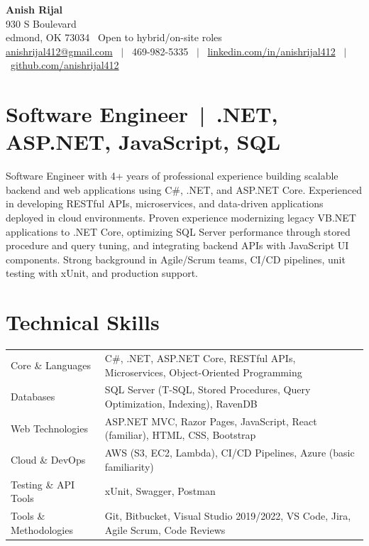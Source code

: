 \documentclass[a4paper,10pt]{article}
\begin{document}
\pagestyle{empty}

\begin{center}
{\Huge \textbf{Anish Rijal}} \\[4pt]

930 S Boulevard \\
edmond, OK 73034 \textbullet\ Open to hybrid/on-site roles \\[4pt]

\href{mailto:anishrijal412@gmail.com}{anishrijal412@gmail.com} \ $|$ \
469-982-5335 \ $|$ \
\href{https://www.linkedin.com/in/anishrijal412}{linkedin.com/in/anishrijal412} \ $|$ \
\href{https://github.com/anishrijal412}{github.com/anishrijal412}
\end{center}

\section*{Software Engineer \,|\, .NET, ASP.NET, JavaScript, SQL}

Software Engineer with 4+ years of professional experience building scalable backend and web applications using C\#, .NET, and ASP.NET Core. Experienced in developing RESTful APIs, microservices, and data-driven applications deployed in cloud environments. Proven experience modernizing legacy VB.NET applications to .NET Core, optimizing SQL Server performance through stored procedure and query tuning, and integrating backend APIs with JavaScript UI components. Strong background in Agile/Scrum teams, CI/CD pipelines, unit testing with xUnit, and production support.

\section{Technical Skills}
\begin{tabularx}{\linewidth}{@{}l X@{}}
Core \& Languages & C\#, .NET, ASP.NET Core, RESTful APIs, Microservices, Object-Oriented Programming \\
Databases & SQL Server (T-SQL, Stored Procedures, Query Optimization, Indexing), RavenDB \\
Web Technologies & ASP.NET MVC, Razor Pages, JavaScript, React (familiar), HTML, CSS, Bootstrap \\
Cloud \& DevOps & AWS (S3, EC2, Lambda), CI/CD Pipelines, Azure (basic familiarity) \\
Testing \& API Tools & xUnit, Swagger, Postman \\
Tools \& Methodologies & Git, Bitbucket, Visual Studio 2019/2022, VS Code, Jira, Agile Scrum, Code Reviews \\
\end{tabularx}
\end{document}
